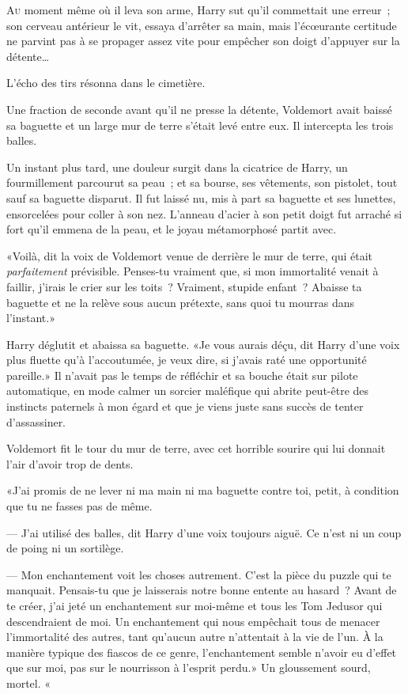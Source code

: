 
\lettrine{A}{u} moment même où il leva son arme, Harry sut qu'il commettait une erreur~; son cerveau antérieur le vit, essaya d'arrêter sa main, mais l'écœurante certitude ne parvint pas à se propager assez vite pour empêcher son doigt d'appuyer sur la détente…

L'écho des tirs résonna dans le cimetière.

Une fraction de seconde avant qu'il ne presse la détente, Voldemort avait baissé sa baguette et un large mur de terre s'était levé entre eux. Il intercepta les trois balles.

Un instant plus tard, une douleur surgit dans la cicatrice de Harry, un fourmillement parcourut sa peau~; et sa bourse, ses vêtements, son pistolet, tout sauf sa baguette disparut. Il fut laissé nu, mis à part sa baguette et ses lunettes, ensorcelées pour coller à son nez. L'anneau d'acier à son petit doigt fut arraché si fort qu'il emmena de la peau, et le joyau métamorphosé partit avec.

«Voilà, dit la voix de Voldemort venue de derrière le mur de terre, qui était \emph{parfaitement} prévisible. Penses-tu vraiment que, si mon immortalité venait à faillir, j'irais le crier sur les toits~? Vraiment, stupide enfant~? Abaisse ta baguette et ne la relève sous aucun prétexte, sans quoi tu mourras dans l'instant.»

Harry déglutit et abaissa sa baguette. «Je vous aurais déçu, dit Harry d'une voix plus fluette qu'à l'accoutumée, je veux dire, si j'avais raté une opportunité pareille.» Il n'avait pas le temps de réfléchir et sa bouche était sur pilote automatique, en mode calmer un sorcier maléfique qui abrite peut-être des instincts paternels à mon égard et que je viens juste sans succès de tenter d'assassiner.

Voldemort fit le tour du mur de terre, avec cet horrible sourire qui lui donnait l'air d'avoir trop de dents.

«J'ai promis de ne lever ni ma main ni ma baguette contre toi, petit, à condition que tu ne fasses pas de même.

--- J'ai utilisé des balles, dit Harry d'une voix toujours aiguë. Ce n'est ni un coup de poing ni un sortilège.

--- Mon enchantement voit les choses autrement. C'est la pièce du puzzle qui te manquait. Pensais-tu que je laisserais notre bonne entente au hasard~? Avant de te créer, j'ai jeté un enchantement sur moi-même et tous les Tom Jedusor qui descendraient de moi. Un enchantement qui nous empêchait tous de menacer l'immortalité des autres, tant qu'aucun autre n'attentait à la vie de l'un. À la manière typique des fiascos de ce genre, l'enchantement semble n'avoir eu d'effet que sur moi, pas sur le nourrisson à l'esprit perdu.» Un gloussement sourd, mortel. «

